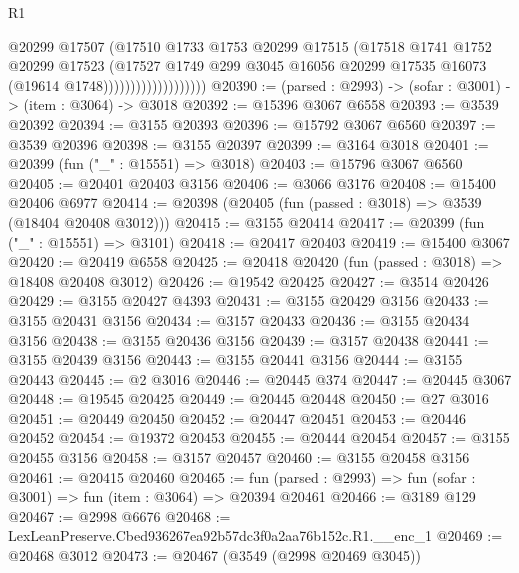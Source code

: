 \begin{lexlean}{R1}
\begin{coremodule}
                                  @20299
                                  @17507
                                  (@17510
                                    @1733
                                    @1753
                                    @20299
                                    @17515
                                    (@17518
                                      @1741
                                      @1752
                                      @20299
                                      @17523
                                      (@17527
                                        @1749
                                        @299
                                        @3045
                                        @16056
                                        @20299
                                        @17535
                                        @16073
                                        (@19614 @1748)))))))))))))))))))
@20390 := (parsed : @2993) -> (sofar : @3001) -> (item : @3064) -> @3018
@20392 := @15396 @3067 @6558
@20393 := @3539 @20392
@20394 := @3155 @20393
@20396 := @15792 @3067 @6560
@20397 := @3539 @20396
@20398 := @3155 @20397
@20399 := @3164 @3018
@20401 := @20399 (fun ("_" : @15551) => @3018)
@20403 := @15796 @3067 @6560
@20405 := @20401 @20403 @3156
@20406 := @3066 @3176
@20408 := @15400 @20406 @6977
@20414 := @20398 (@20405 (fun (passed : @3018) => @3539 (@18404 @20408 @3012)))
@20415 := @3155 @20414
@20417 := @20399 (fun ("_" : @15551) => @3101)
@20418 := @20417 @20403
@20419 := @15400 @3067
@20420 := @20419 @6558
@20425 := @20418 @20420 (fun (passed : @3018) => @18408 @20408 @3012)
@20426 := @19542 @20425
@20427 := @3514 @20426
@20429 := @3155 @20427 @4393
@20431 := @3155 @20429 @3156
@20433 := @3155 @20431 @3156
@20434 := @3157 @20433
@20436 := @3155 @20434 @3156
@20438 := @3155 @20436 @3156
@20439 := @3157 @20438
@20441 := @3155 @20439 @3156
@20443 := @3155 @20441 @3156
@20444 := @3155 @20443
@20445 := @2 @3016
@20446 := @20445 @374
@20447 := @20445 @3067
@20448 := @19545 @20425
@20449 := @20445 @20448
@20450 := @27 @3016
@20451 := @20449 @20450
@20452 := @20447 @20451
@20453 := @20446 @20452
@20454 := @19372 @20453
@20455 := @20444 @20454
@20457 := @3155 @20455 @3156
@20458 := @3157 @20457
@20460 := @3155 @20458 @3156
@20461 := @20415 @20460
@20465 := fun (parsed : @2993) => fun (sofar : @3001) => fun (item : @3064) => @20394 @20461
@20466 := @3189 @129
@20467 := @2998 @6676
@20468 := LexLeanPreserve.Cbed936267ea92b57dc3f0a2aa76b152c.R1.__enc_1
@20469 := @20468 @3012
@20473 := @20467 (@3549 (@2998 @20469 @3045))

\end{coremodule}
\end{lexlean}
